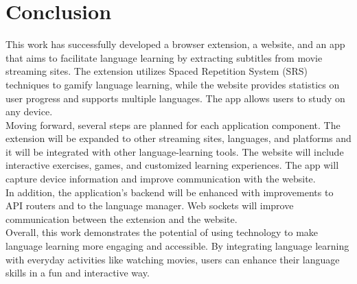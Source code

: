 \documentclass[12pt]{article}
\begin{document}
\section{
Conclusion
}
This work has successfully developed a browser extension, a website, and an app that aims to facilitate language learning by extracting subtitles from movie streaming sites. The extension utilizes Spaced Repetition System (SRS) techniques to gamify language learning, while the website provides statistics on user progress and supports multiple languages. The app allows users to study on any device. \\
Moving forward, several steps are planned for each application component. The extension will be expanded to other streaming sites, languages, and platforms and it will be integrated with other language-learning tools. The website will include interactive exercises, games, and customized learning experiences. The app will capture device information and improve communication with the website. \\
In addition, the application's backend will be enhanced with improvements to API routers and to the language manager. Web sockets will improve communication between the extension and the website. \\
Overall, this work demonstrates the potential of using technology to make language learning more engaging and accessible. By integrating language learning with everyday activities like watching movies, users can enhance their language skills in a fun and interactive way.\\









\hfill \\
\hfill \\
\hfill \\
\hfill \\
\hfill \\
\hfill \\
\hfill \\
\hfill 
\centering
\end{document}
